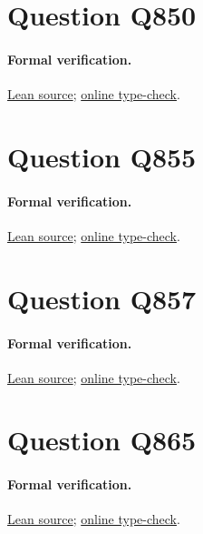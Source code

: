 \documentclass[11pt]{article}
\begin{document}
\section{Question Q850}

\paragraph{Formal verification.}
\href{https://github.com/l-pommeret/rms-math-proofs/blob/8617a6221f74436860d338e664c87d076388ec0b/lean/RMS/Q850.lean}{Lean source}; \href{https://github.com/l-pommeret/rms-math-proofs/actions/runs/31289257261}{online type-check}.

\section{Question Q855}

\paragraph{Formal verification.}
\href{https://github.com/l-pommeret/rms-math-proofs/blob/76da7427f1f23b74c4dba30d5a7059a65a2e4896/lean/RMS/Q855.lean}{Lean source}; \href{https://github.com/l-pommeret/rms-math-proofs/actions/runs/31312598650}{online type-check}.

\section{Question Q857}

\paragraph{Formal verification.}
\href{https://github.com/l-pommeret/rms-math-proofs/blob/d65a5d4995d62c8e46887b1d96d3ec223704ad25/lean/RMS/Q857Main.lean}{Lean source}; \href{https://github.com/l-pommeret/rms-math-proofs/actions/runs/31327223717}{online type-check}.

\section{Question Q865}

\paragraph{Formal verification.}
\href{https://github.com/l-pommeret/rms-math-proofs/blob/46b287a18360636b8bd5681dff404f187078dc32/lean/RMS/Q865Completion.lean}{Lean source}; \href{https://github.com/l-pommeret/rms-math-proofs/actions/runs/31314175723}{online type-check}.
\end{document}
